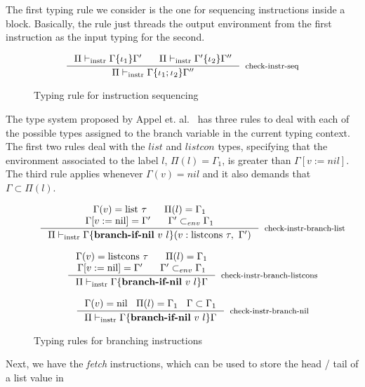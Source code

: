 \documentclass[review]{elsarticle}
\theoremstyle{definition}
\begin{document}
The first typing rule we consider is the one for sequencing instructions inside a block. Basically,
the rule just threads the output environment from the first instruction as the input typing for the
second.
\begin{figure}[H]
\[
\inference{\Pi \vdash_{\text{instr}} \Gamma\{ \iota_1 \}\Gamma'\:\:\:\:\:\:\:\:\Pi \vdash_{\text{instr}} \Gamma'\{ \iota_2 \}\Gamma''}
          {\Pi \vdash_{\text{instr}} \Gamma\{ \iota_1 ; \iota_2 \}\Gamma''}[check-instr-seq]
\]
\centering
\caption{Typing rule for instruction sequencing}
\label{fig:typing-seq}
\end{figure}
The type system proposed by Appel et. al.~\cite{AppelDL12} has three rules to deal with each of the possible
types assigned to the branch variable in the current typing context. The first two rules deal with the $list$ and $listcon$
types, specifying that the environment associated to the label $l$, $\Pi(l) = \Gamma_1$, is greater than
$\Gamma[v := nil]$. The third rule applies whenever $\Gamma(v) = nil$ and it also demands that $\Gamma \subset \Pi(l)$.
\begin{figure}[H]
\[
\begin{array}{c}
\inference{\Gamma(v) = \text{list}~\tau\:\:\:\:\:\:\:\:\Pi(l) = \Gamma_1\\
                     \Gamma[v:=\text{nil}]=\Gamma'\:\:\:\:\:\:\:\:\Gamma' \subset_{env} \Gamma_1}
          {\Pi \vdash_{\text{instr}} \Gamma\{ \textbf{branch-if-nil}~v~l \}(v: \text{listcons}~\tau,~\Gamma')}
          [check-instr-branch-list]
\\ \\

\inference{\Gamma(v) = \text{listcons}~\tau\:\:\:\:\:\:\:\:\Pi(l) = \Gamma_1\\
           \Gamma[v:=\text{nil}]=\Gamma'\:\:\:\:\:\:\:\:\Gamma' \subset_{env} \Gamma_1}
          {\Pi \vdash_{\text{instr}} \Gamma\{ \textbf{branch-if-nil}~v~l \}\Gamma}
          [check-instr-branch-listcons]

\\ \\
\inference{\Gamma(v) = \text{nil}\:\:\:\:\Pi(l) = \Gamma_1\:\:\:\:\Gamma \subset \Gamma_1}
          {\Pi \vdash_{\text{instr}} \Gamma\{ \textbf{branch-if-nil}~v~l \}\Gamma}
          [check-instr-branch-nil]
\end{array}
\]
\centering
\caption{Typing rules for branching instructions}
\label{fig:typing-branch}
\end{figure}
Next, we have the \emph{fetch} instructions, which can be used to store the head / tail of a list value in
\end{document}
